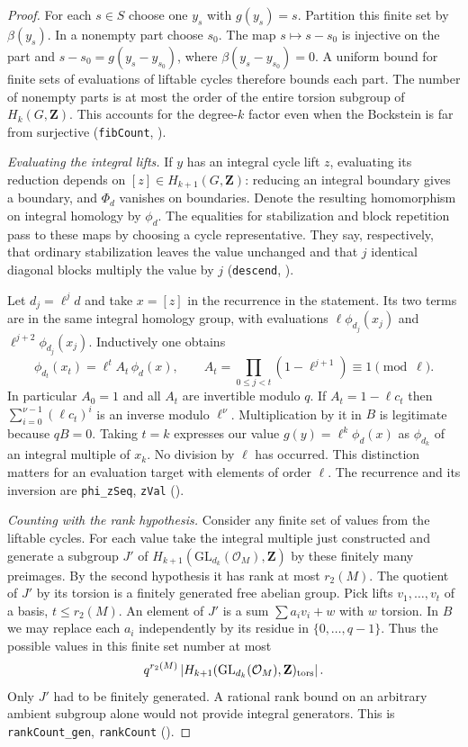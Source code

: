 \begin{proof}
For each $s\in S$ choose one $y_s$ with $g(y_s)=s$. Partition this
finite set by $\beta(y_s)$. In a nonempty part choose $s_0$. The map
$s\mapsto s-s_0$ is injective on the part and
$s-s_0=g(y_s-y_{s_0})$, where $\beta(y_s-y_{s_0})=0$. A uniform bound
for finite sets of evaluations of liftable cycles therefore bounds each
part. The number of nonempty parts is at most the order of the entire
torsion subgroup of $H_k(G,\mathbf Z)$. This accounts for the degree-$k$
factor even when the Bockstein is far from surjective
(\nolinkurl{fibCount}, ).

\smallskip\noindent\emph{Evaluating the integral lifts.}
If $y$ has an integral cycle lift $z$, evaluating its reduction depends
on $[z]\in H_{k+1}(G,\mathbf Z)$: reducing an integral boundary gives
a boundary, and $\Phi_d$ vanishes on boundaries. Denote the resulting
homomorphism on integral homology by $\phi_d$. The equalities for
stabilization and block repetition pass to these maps by choosing a cycle
representative. They say, respectively, that ordinary stabilization leaves
the value unchanged and that $j$ identical diagonal blocks multiply the
value by $j$ (\nolinkurl{descend}, ).

Let $d_j=\ell^j d$ and take $x=[z]$ in the recurrence in the statement.
Its two terms are in the same integral homology group, with evaluations
$\ell\phi_{d_j}(x_j)$ and $\ell^{j+2}\phi_{d_j}(x_j)$.
Inductively one obtains
\[
 \phi_{d_t}(x_t)=\ell^t A_t\,\phi_d(x),\qquad
 A_t=\prod_{0\le j<t}(1-\ell^{j+1})\equiv1\pmod\ell .
\]
In particular $A_0=1$ and all $A_t$ are invertible modulo $q$. If
$A_t=1-\ell c_t$ then $\sum_{i=0}^{\nu-1}(\ell c_t)^i$ is an inverse
modulo $\ell^\nu$. Multiplication by it in $B$ is legitimate because
$qB=0$. Taking $t=k$ expresses our value $g(y)=\ell^k\phi_d(x)$ as
$\phi_{d_k}$ of an integral multiple of $x_k$. No division by $\ell$
has occurred. This distinction matters for an evaluation target with
elements of order $\ell$. The recurrence and its inversion are
\nolinkurl{phi_zSeq}, \nolinkurl{zVal}
().

\smallskip\noindent\emph{Counting with the rank hypothesis.}
Consider any finite set of values from the liftable cycles.
For each value take the integral multiple just constructed and generate
a subgroup $J'$ of $H_{k+1}(\mathrm{GL}_{d_k}(\mathcal O_M),\mathbf Z)$
by these finitely many preimages. By the second hypothesis it has rank
at most $r_2(M)$. The quotient of $J'$ by its torsion is a finitely
generated free abelian group. Pick lifts $v_1,\ldots,v_t$ of a basis,
$t\le r_2(M)$. An element of $J'$ is a sum $\sum a_i v_i+w$ with
$w$ torsion. In $B$ we may replace each $a_i$ independently by its
residue in $\{0,\ldots,q-1\}$. Thus the possible values in this finite
set number at most
\[
  q^{r_2(M)}
     \left|H_{k+1}(\mathrm{GL}_{d_k}(\mathcal O_M),\mathbf Z)_{\rm tors}\right|.
\]
Only $J'$ had to be finitely generated. A rational rank bound on an
arbitrary ambient subgroup alone would not provide integral generators.
This is \nolinkurl{rankCount_gen}, \nolinkurl{rankCount}
().


\end{proof}
